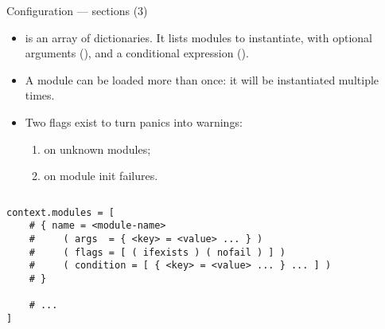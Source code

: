 \begin{frame}[fragile]{Configuration — sections (3)}

  \begin{itemize}

  \item {} is an array of dictionaries. It lists
    modules to instantiate, with optional arguments (),
     and a conditional expression ().

  \item A module can be loaded more than once: it will be instantiated
    multiple times.

  \item Two flags exist to turn panics into warnings:

    \begin{enumerate}
    \item {} on unknown modules;
    \item {} on module init failures.
    \end{enumerate}

  \end{itemize}

  \begin{columns}
    \begin{block}{}
      \fontsize{8}{8}\selectfont
        \begin{verbatim}
context.modules = [
    # { name = <module-name>
    #     ( args  = { <key> = <value> ... } )
    #     ( flags = [ ( ifexists ) ( nofail ) ] )
    #     ( condition = [ { <key> = <value> ... } ... ] )
    # }

    # ...
]
        \end{verbatim}
      \end{block}
  \end{columns}

\end{frame}



